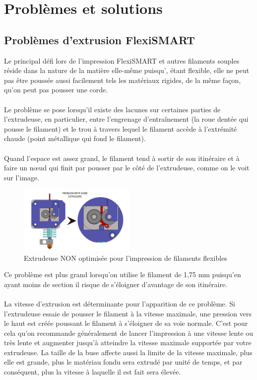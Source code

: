 \documentclass[11pt,a4paper]{article}
\begin{document}
\section{Problèmes et solutions}
	\subsection{Problèmes d’extrusion FlexiSMART}
Le principal défi lors de l’impression FlexiSMART et autres filaments souples réside dans la nature de la matière elle-même puisqu’, étant flexible, elle ne peut pas être poussée aussi facilement tels les matériaux rigides, de la même façon, qu’on peut pas pousser une corde.
\\\\
Le problème se pose lorsqu’il existe des lacunes sur certaines parties de l’extrudeuse, en particulier, entre l’engrenage d’entraînement (la roue dentée qui pousse le filament) et le trou à travers lequel le filament accède à l’extrémité chaude (point métallique qui fond le filament).
\\\\
Quand l’espace est assez grand, le filament tend à sortir de son itinéraire et à faire un nœud qui finit par pousser par le côté de l'extrudeuse, comme on le voit sur l’image.
\begin{figure}[H]
\centering
\includegraphics[width=0.5\textwidth,cfbox=azul_marcos 4pt 0pt]{FOTOS/NUDOS1}
\caption*{Extrudeuse NON optimisée pour l'impression de filaments flexibles}
\end{figure}
Ce problème est plus grand lorsqu'on utilise le filament de 1,75 mm puisqu’en ayant moins de section il risque de s'éloigner d’avantage de son itinéraire.
\\\\
La vitesse d’extrusion est déterminante pour l’apparition de ce problème. Si l’extrudeuse essaie de pousser le filament à la vitesse maximale, une pression vers le haut est créée poussant le filament à s’éloigner  de sa voie normale. C’est pour cela qu’on recommande généralement de lancer l’impression à une vitesse lente ou très lente et augmenter jusqu'à atteindre la vitesse maximale supportée par votre extrudeuse. La taille de la buse affecte aussi la limite de la vitesse maximale, plus elle est grande, plus le matériau fondu sera extrudé par unité de temps, et par conséquent, plus la vitesse à laquelle il est fait sera élevée.
\end{document}

